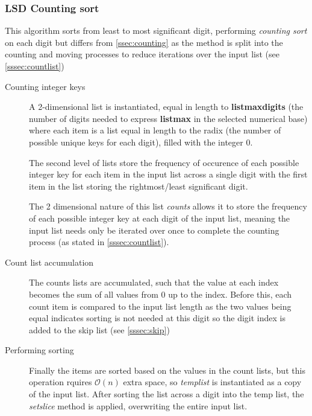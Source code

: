 \documentclass[12pt]{article}
\begin{document}
	\subsubsection{LSD Counting sort}
	\label{sssec:lsdcounting}
	This algorithm sorts from least to most significant digit, performing \textit{counting sort} on each digit but differs from \ref{ssec:counting} as the method is split into the counting and moving processes to reduce iterations over the input list (see \ref{sssec:countlist})
	\begin{description}
		\item[Counting integer keys] A 2-dimensional list is instantiated, equal in length to \textbf{list\textunderscore max\textunderscore digits} (the number of digits needed to express \textbf{list\textunderscore max} in the selected numerical base) where each item is a list equal in length to the radix (the number of possible unique keys for each digit), filled with the integer $0$. 
		\par The second level of lists store the frequency of occurence of each possible integer key for each item in the input list across a single digit with the first item in the list storing the rightmost/least significant digit.
		\par The 2 dimensional nature of this list \textit{counts} allows it to store the frequency of each possible integer key at each digit of the input list, meaning the input list needs only be iterated over once to complete the counting process (as stated in \ref{sssec:countlist}).
	\item[Count list accumulation] The counts lists are accumulated, such that the value at each index becomes the sum of all values from 0 up to the index. Before this, each count item is compared to the input list length as the two values being equal indicates sorting is not needed at this digit so the digit index is added to the skip list (see \ref{sssec:skip})
	\item[Performing sorting] Finally the items are sorted based on the values in the count lists, but this operation rquires $\mathcal{O}(n)$ extra space, so \textit{temp\textunderscore list} is instantiated as a copy of the input list. After sorting the list across a digit into the temp list, the \textit{setslice} method is applied, overwriting the entire input list.
\end{description}
\end{document}
